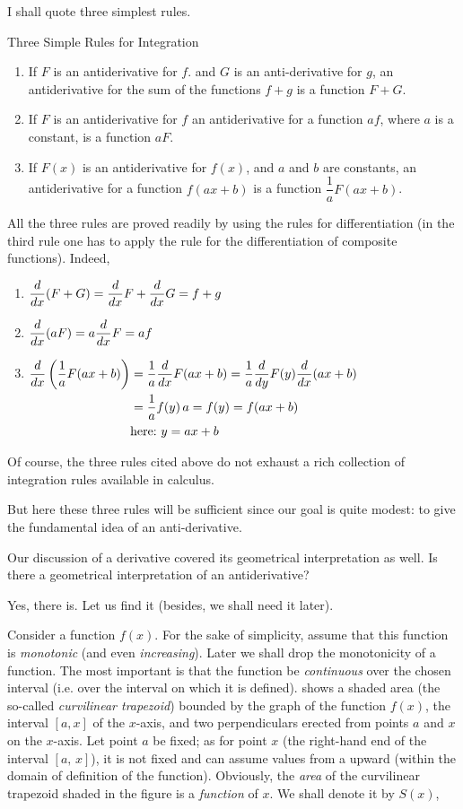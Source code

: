 \athr I shall quote three simplest rules.
\begin{mytheo}{Three Simple Rules for Integration}
\begin{enumerate}[label=\protect\circled{\arabic*}]
\item If $F$ is an antiderivative for $f$. and $G$ is an anti-derivative for $g$, an antiderivative for the sum of the functions $f + g$ is a function $F + G$.
\item If $F$ is an antiderivative for $f$ an antiderivative for a function $af$, where $a$ is a constant, is a function $aF$.
\item If $F (x)$ is an antiderivative for $f (x)$, and $a$ and $b$ are constants, an antiderivative for a function $f (ax + b)$ is a function $\dfrac{1}{a} F (ax + b)$.
\end{enumerate}
\end{mytheo}
All the three rules are proved readily by using the rules for differentiation (in the third rule one has to apply the rule for the differentiation of composite functions). Indeed,
\begin{enumerate}[label=\protect\circled{\arabic*}]
\item $\dfrac{d}{dx} (F+G) = \dfrac{d}{dx} F + \dfrac{d}{dx} G= f + g$ 
\item $\dfrac{d}{dx} (aF)= a \dfrac{d}{dx} F= af$
\item $\begin{aligned}[t]%
\ddx \left( \frac{1}{a} F (ax + b)  \right)  & = \frac{1}{a} \ddx F(ax +b) =  \frac{1}{a} \dfrac{d}{dy} F(y) \ddx (ax +b) \\
& =  \frac{1}{a} f(y)\, a = f(y) = f(ax +b) 
\\ & \text{here:} \,\, y = ax +b
\end{aligned}$
\end{enumerate}
Of course, the three rules cited above do not exhaust a rich collection of integration rules available in calculus. 

But here these three rules will be sufficient since our goal is quite modest: to give the fundamental idea of an anti-derivative.

\rdr Our discussion of a derivative covered its geometrical interpretation as well. Is there a geometrical  interpretation of an antiderivative?

\athr Yes, there is. Let us find it (besides, we shall need it later).

Consider a function $f (x)$. For the sake of simplicity, assume that this function is \emph{monotonic} (and even \emph{increasing}). Later we shall drop the monotonicity of a function. The most important is that the function be \emph{continuous} over the chosen interval (i.e. over the interval on which it is defined).  shows a shaded area (the so-called \emph{curvilinear trapezoid}) bounded by the graph of the function $f (x)$, the interval $[a, x]$ of the $x$-axis, and two perpendiculars	erected from points $a$ and $x$ on the $x$-axis. Let point $a$ be fixed; as for point $x$ (the right-hand end of the interval $[a, \, x]$), it is not fixed and can assume values from a upward (within the domain of definition of the function). Obviously, the \emph{area} of the curvilinear trapezoid shaded in the figure is a \emph{function} of $x$. We shall denote it by $S (x)$,

